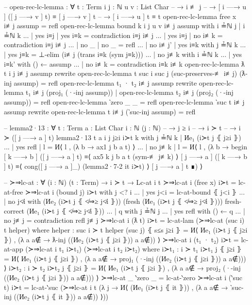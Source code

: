 \documentclass[logo,bsc,singlespacing,parskip,online]{infthesis}
\renewenvironment{code}{\mintedcopy[breaklines,breaksymbolleft=\;]{agda}}{\endmintedcopy}
\begin{document}
\begin{code}
-- open-rec-lc-lemma : ∀ {t : Term} {i j : ℕ} {u v : List Char}
--   → i ≢ j
--   → [ i —→ u ] ([ j —→ v ] t) ≡ [ j —→ v ] t
--   → [ i —→ u ] t ≡ t
open-rec-lc-lemma {free x} i≢j assump = refl
open-rec-lc-lemma {bound k} {i} {j} {u} {v} i≢j assump with i ≟ℕ j | i ≟ℕ k
... | yes i≡j | yes i≡k = contradiction i≡j i≢j
... | yes i≡j | no  i≢k = contradiction i≡j i≢j
... | no  _   | no  _   = refl
... | no i≢j' | yes i≡k with j ≟ℕ k
...   | yes j≡k = ⊥-elim (i≢j (trans i≡k (sym j≡k)))
...   | no  j≢k with i ≟ℕ k
...     | yes i≡k' with () ← assump
...     | no  i≢k  = contradiction i≡k i≢k
open-rec-lc-lemma {ƛ t} {i} {j} i≢j assump
  rewrite open-rec-lc-lemma {t} {suc i} {suc j} (suc-preserves-≢ i≢j) (ƛ-inj assump)
    = refl
open-rec-lc-lemma {t₁ · t₂} i≢j assump
  rewrite
    open-rec-lc-lemma {t₁} i≢j (proj₁ (·-inj assump))
   | open-rec-lc-lemma {t₂} i≢j (proj₂ (·-inj assump))
  = refl
open-rec-lc-lemma {‵zero} _ _ = refl
open-rec-lc-lemma {‵suc t} i≢j assump
  rewrite open-rec-lc-lemma {t} i≢j (‵suc-inj assump) = refl

-- lemma2·13 : ∀ {t : Term} {a : List Char} {i : ℕ} (j : ℕ)
--   → j ≥ i
--   → i ≻ t
--   → i ≻ ([ j —→ a ] t)
lemma2·13 {t} {a} {i} j j≥i i≻t k with j ≟ℕ k | Иe₁ (i≻t j ⦃ j≥i ⦄)
... | yes refl | l = И⟨ l , (λ b → ax1 j b a t) ⟩
... | no  j≢k  | l = И⟨ l , (λ b →
  begin
    [ k —→ b ] ([ j —→ a ] t)
  ≡⟨ ax5 k j b a t (sym-≢ j≢k) ⟩
    [ j —→ a ] ([ k —→ b ] t)
  ≡⟨ cong([ j —→ a ]_) (lemma2·7-2 it i≻t) ⟩
    [ j —→ a ] t
  ∎) ⟩

-- ≻⇒lc-at : ∀ (i : ℕ) (t : Term) → i ≻ t → Lc-at i t
≻⇒lc-at i (free x) i≻t = lc-at-free
≻⇒lc-at i (bound j) i≻t with j <? i
... | yes j<i = lc-at-bound ⦃ j<i ⦄
... | no  j≮i with
  (Иe₂ (i≻t j ⦃ ≮⇒≥ j≮i ⦄)) (fresh (Иe₁ (i≻t j ⦃ ≮⇒≥ j≮i ⦄))) {fresh-correct (Иe₁ (i≻t j ⦃ ≮⇒≥ j≮i ⦄))}
...   | q with j ≟ℕ j
...     | yes refl with () ← q
...     | no  j≢j  = contradiction refl j≢j
≻⇒lc-at i (ƛ t) i≻t = lc-at-lam (≻⇒lc-at (suc i) t helper)
  where
    helper : suc i ≻ t
    helper (suc j) ⦃ s≤s j≥i ⦄ =
      И⟨ Иe₁ (i≻t j ⦃ j≥i ⦄)
      , (λ a {a∉} → ƛ-inj ((Иe₂ (i≻t j ⦃ j≥i ⦄)) a {a∉})) ⟩
≻⇒lc-at i (t₁ · t₂) i≻t = lc-at-app (≻⇒lc-at i t₁ i≻t₁) (≻⇒lc-at i t₂ i≻t₂)
  where
    i≻t₁ : i ≻ t₁
    i≻t₁ j ⦃ j≥i ⦄ =
      И⟨ Иe₁ (i≻t j ⦃ j≥i ⦄)
      , (λ a {a∉} → proj₁ (·-inj ((Иe₂ (i≻t j ⦃ j≥i ⦄)) a {a∉}))) ⟩
    i≻t₂ : i ≻ t₂
    i≻t₂ j ⦃ j≥i ⦄ =
      И⟨ Иe₁ (i≻t j ⦃ j≥i ⦄)
      , (λ a {a∉} → proj₂ (·-inj ((Иe₂ (i≻t j ⦃ j≥i ⦄)) a {a∉}))) ⟩
≻⇒lc-at _ ‵zero _ = lc-at-‵zero
≻⇒lc-at i (‵suc t) i≻t = lc-at-‵suc (≻⇒lc-at i t (λ j →
  И⟨ (Иe₁ (i≻t j ⦃ it ⦄))
  , (λ a {a∉} → ‵suc-inj ((Иe₂ (i≻t j ⦃ it ⦄)) a {a∉})) ⟩))


\end{code}
\end{document}
